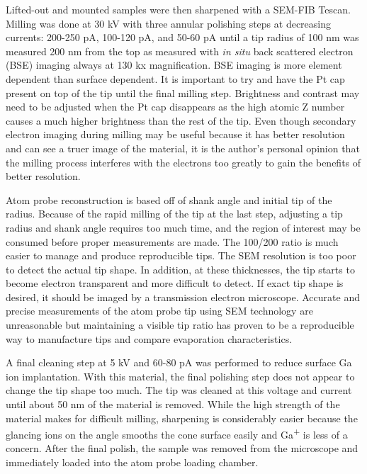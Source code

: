 		Lifted-out and mounted samples were then sharpened with a SEM-FIB Tescan. Milling was done at 30 kV with three annular polishing steps at decreasing currents: 200-250 pA, 100-120 pA, and 50-60 pA until a tip radius of 100 nm was measured 200 nm from the top as measured with \textit{in situ} back scattered electron (BSE) imaging always at 130 kx magnification. BSE imaging is more element dependent than surface dependent. It is important to try and have the Pt cap present on top of the tip until the final milling step. Brightness and contrast may need to be adjusted when the Pt cap disappears as the high atomic Z number causes a much higher brightness than the rest of the tip. Even though secondary electron imaging during milling may be useful because it has better resolution and can see a truer image of the material, it is the author’s personal opinion that the milling process interferes with the electrons too greatly to gain the benefits of better resolution. 
		
		
		
		Atom probe reconstruction is based off of shank angle and initial tip of the radius. Because of the rapid milling of the tip at the last step, adjusting a tip radius and shank angle requires too much time, and the region of interest may be consumed before proper measurements are made. The 100/200 ratio is much easier to manage and produce reproducible tips. The SEM resolution is too poor to detect the actual tip shape. In addition, at these thicknesses, the tip starts to become electron transparent and more difficult to detect. If exact tip shape is desired, it should be imaged by a transmission electron microscope. Accurate and precise measurements of the atom probe tip using SEM technology are unreasonable but maintaining a visible tip ratio has proven to be a reproducible way to manufacture tips and compare evaporation characteristics. 
		
		
		
		A final cleaning step at 5 kV and 60-80 pA was performed to reduce surface Ga ion implantation. With this material, the final polishing step does not appear to change the tip shape too much. The tip was cleaned at this voltage and current until about 50 nm of the material is removed. While the high strength of the material makes for difficult milling, sharpening is considerably easier because the glancing ions on the angle smooths the cone surface easily and Ga\textsuperscript{+} is less of a concern. After the final polish, the sample was removed from the microscope and immediately loaded into the atom probe loading chamber. 
		
